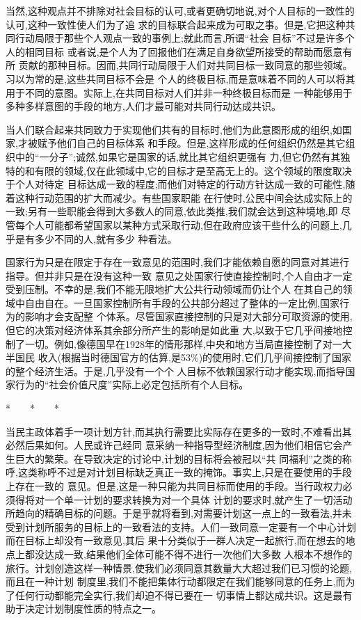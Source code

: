 ﻿\documentclass[12pt]{article}
\begin{document}
当然,这种观点并不排除对社会目标的认可,或者更确切地说,对个人目标的一致性的认可,这种一致性使人们为了追
求的目标联合起来成为可取之事。但是,它把这种共同行动局限于那些个人观点一致的事例上;就此而言,所谓``社会
目标''不过是许多个人的相同目标 \myrule 或者说,是个人为了回报他们在满足自身欲望所接受的帮助而愿意有所
贡献的那种目标。因而,共同行动局限于人们对共同目标一致同意的那些领域。习以为常的是,这些共同目标不会是
个人的终极目标,而是意味着不同的人可以将其用于不同的意图。实际上,在共同目标对人们并非一种终极目标而是
一种能够用于多种多样意图的手段的地方,人们才最可能对共同行动达成共识。

当人们联合起来共同致力于实现他们共有的目标时,他们为此意图形成的组织,如国家,才被赋予他们自己的目标体系
和手段。但是,这样形成的任何组织仍然是其它组织中的``一分子'';诚然,如果它是国家的话,就比其它组织更强有
力,但它仍然有其独特的和有限的领域,仅在此领域中,它的目标才是至高无上的。这个领域的限度取决于个人对待定
目标达成一致的程度;而他们对特定的行动方针达成一致的可能性,随着这种行动范围的扩大而减少。有些国家职能
在行使时,公民中间会达成实际上的一致;另有一些职能会得到大多数人的同意,依此类推,我们就会达到这种境地,即
尽管每个人可能都希望国家以某种方式采取行动,但在政府应该干些什么的问题上,几乎是有多少不同的人,就有多少
种看法。

国家行为只是在限定于存在一致意见的范围时,我们才能依赖自愿的同意对其进行指导。但并非只是在没有这种一致
意见之处国家行使直接控制时,个人自由才一定受到压制。不幸的是,我们不能无限地扩大公共行动领域而仍让个人
在其自己的领域中自由自在。一旦国家控制所有手段的公共部分超过了整体的一定比例,国家行为的影响才会支配整
个体系。尽管国家直接控制的只是对大部分可取资源的使用,但它的决策对经济体系其余部分所产生的影响是如此重
大,以致于它几乎间接地控制了一切。例如,像德国早在1928年的情形那样,中央和地方当局直接控制了对一大半国民
收入(根据当时德国官方的估算,是53\%)的使用时,它们几乎间接控制了国家的整个经济生活。于是,几乎没有一个个
人目标不依赖国家行动才能实现,而指导国家行为的``社会价值尺度''实际上必定包括所有个人目标。

*　　*　　*

当民主政体着手一项计划方针,而其执行需要比实际存在更多的一致时,不难看出其必然后果如何。人民或许己经同
意采纳一种指导型经济制度,因为他们相信它会产生巨大的繁荣。在导致决定的讨论中,计划的目标将会被冠以``共
同福利''之类的称呼,这类称呼不过是对计划目标缺乏真正一致的掩饰。事实上,只是在要使用的手段上存在一致的
意见。但是,这是一种只能为共同目标而使用的手段。当行政权力必须得将对一个单一计划的要求转换为对一个具体
计划的要求时,就产生了一切活动所趋向的精确目标的问题。于是乎就将看到,对需要计划这一点上的一致看法,并未
受到计划所服务的目标上的一致看法的支持。人们一致同意一定要有一个中心计划而在目标上却没有一致意见,其后
果十分类似于一群人决定一起旅行,而在想去的地点上都没达成一致,结果他们全体可能不得不进行一次他们大多数
人根本不想作的旅行。计划创造这样一种情景,使我们必须同意其数量大大超过我们已习惯的论题,而且在一种计划
制度里,我们不能把集体行动都限定在我们能够同意的任务上,而为了任何行动都能完全实行,我们却迫不得已要在一
切事情上都达成共识。这是最有助于决定计划制度性质的特点之一。
\end{document}
